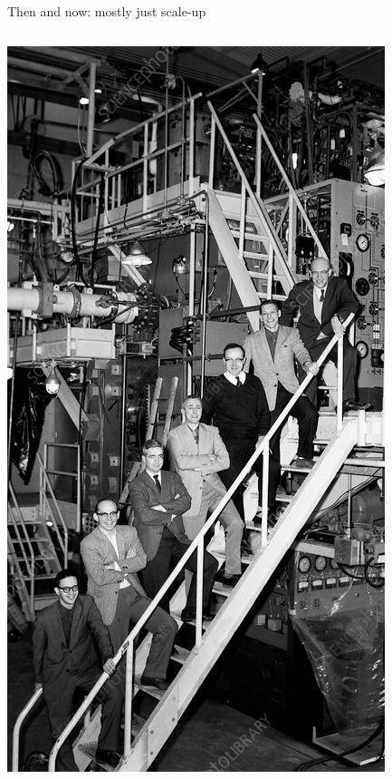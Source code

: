 \documentclass[aspectratio=169]{beamer}
\begin{document}
\begin{frame}{Then and now: mostly just scale-up}
\vspace{0.15 cm}
\begin{columns}
\includegraphics[width=\linewidth]{H4000010-Team_that_discovered_Omega_minus_particle.jpg}


\end{columns}
\end{frame}
\end{document}
